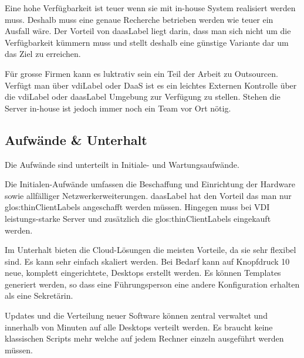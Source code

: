 Eine hohe Verfügbarkeit ist teuer wenn sie mit in-house System realisiert werden muss. Deshalb muss eine genaue Recherche betrieben werden wie teuer ein Ausfall wäre. Der Vorteil von \Gls{daasLabel} liegt darin, dass man sich nicht um die Verfügbarkeit kümmern muss und stellt deshalb eine günstige Variante dar um das Ziel zu erreichen.

Für grosse Firmen kann es luktrativ sein ein Teil der Arbeit zu Outsourcen. Verfügt man über \Gls{vdiLabel} oder DaaS ist es ein leichtes Externen Kontrolle über die \Gls{vdiLabel} oder \Gls{daasLabel} Umgebung zur Verfügung zu stellen. Stehen die Server in-house ist jedoch immer noch ein Team vor Ort nötig.

\subsection{Aufwände \& Unterhalt}




Die Aufwände sind unterteilt in Initiale- und Wartungsaufwände.

Die Initialen-Aufwände umfassen die Beschaffung und Einrichtung der Hardware sowie allfälliger Netzwerkerweiterungen. \Gls{daasLabel} hat den Vorteil das man nur \glspl{glos:thinClientLabel} angeschafft werden müssen. Hingegen muss bei VDI leistungs-starke Server und zusätzlich die \glspl{glos:thinClientLabel} eingekauft werden.

Im Unterhalt bieten die Cloud-Lösungen die meisten Vorteile, da sie sehr flexibel sind. Es kann sehr einfach skaliert werden. Bei Bedarf kann auf Knopfdruck 10 neue, komplett eingerichtete,  Desktops erstellt werden. Es können Templates generiert werden, so dass eine Führungsperson eine andere Konfiguration erhalten als eine Sekretärin.

Updates und die Verteilung neuer Software können zentral verwaltet und innerhalb von Minuten auf alle Desktops verteilt werden. Es braucht keine klassischen Scripts mehr welche auf jedem Rechner einzeln ausgeführt werden müssen.

